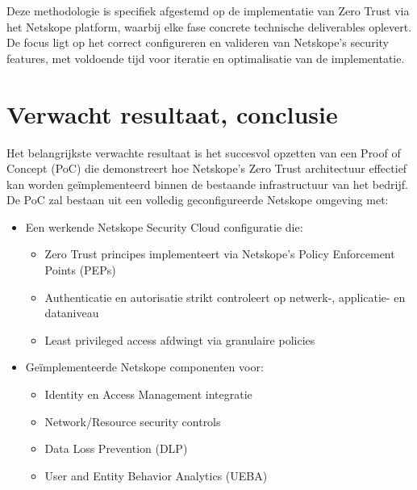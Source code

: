 Deze methodologie is specifiek afgestemd op de implementatie van Zero Trust via het Netskope platform, waarbij elke fase concrete technische deliverables oplevert. De focus ligt op het correct configureren en valideren van Netskope's security features, met voldoende tijd voor iteratie en optimalisatie van de implementatie.




\section{Verwacht resultaat, conclusie}%
\label{sec:verwachte_resultaten}

Het belangrijkste verwachte resultaat is het succesvol opzetten van een Proof of Concept (PoC) die demonstreert hoe Netskope's Zero Trust architectuur effectief kan worden geïmplementeerd binnen de bestaande infrastructuur van het bedrijf. 
De PoC zal bestaan uit een volledig geconfigureerde Netskope omgeving met:

\begin{itemize}
  \item Een werkende Netskope Security Cloud configuratie die:
  \begin{itemize}
    \item Zero Trust principes implementeert via Netskope's Policy Enforcement Points (PEPs)
    \item Authenticatie en autorisatie strikt controleert op netwerk-, applicatie- en dataniveau
    \item Least privileged access afdwingt via granulaire policies
  \end{itemize}
  
  \item Geïmplementeerde Netskope componenten voor:
  \begin{itemize}
    \item Identity en Access Management integratie
    \item Network/Resource security controls
    \item Data Loss Prevention (DLP)
    \item User and Entity Behavior Analytics (UEBA)
  \end{itemize}
\end{itemize}

